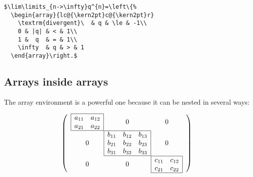 \begin{table}[htb]
\medskip
\begin{lstlisting}
$\lim\limits_{n->\infty}q^{n}=\left\{%
  \begin{array}{lc@{\kern2pt}c@{\kern2pt}r}
	\textrm{divergent}\  & q & \le & -1\\
	0 & |q| & < & 1\\
	1 &  q  & = & 1\\
	\infty  & q & > & 1
  \end{array}\right.$
\end{lstlisting}

\subsection{Arrays inside arrays}
The array environment is a powerful one because it can be nested in several ways:

\[
\left(
\begin{array}{c@{}c@{}c}
\begin{array}{|cc|}
\hline
a_{11} & a_{12} \\
a_{21} & a_{22} \\
\hline
\end{array} & 0 & 0 \\
0 & \begin{array}{|ccc|}
    \hline
    b_{11} & b_{12} & b_{13}\\
    b_{21} & b_{22} & b_{23}\\
    b_{31} & b_{32} & b_{33}\\
    \hline
    \end{array} & 0 \\
0 & 0 & \begin{array}{|cc|}
        \hline
        c_{11} & c_{12} \\
        c_{21} & c_{22} \\
        \hline
        \end{array} \\
\end{array}
\right)
\]


\end{table}
